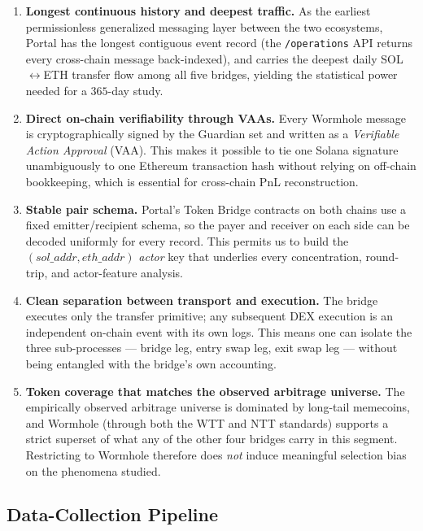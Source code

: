 \documentclass[sigconf,nonacm,10pt]{acmart}
\begin{document}
\begin{enumerate}
    \item \textbf{Longest continuous history and deepest traffic.} As the
        earliest permissionless generalized messaging layer between the two
        ecosystems, Portal has the longest contiguous event record (the
        \texttt{/operations} API returns every cross-chain message
        back-indexed), and carries the deepest daily SOL$\leftrightarrow$ETH
        transfer flow among all five bridges, yielding the statistical power
        needed for a $365$-day study.
    \item \textbf{Direct on-chain verifiability through VAAs.} Every
        Wormhole message is cryptographically signed by the Guardian set and
        written as a \emph{Verifiable Action Approval} (VAA). This makes it
        possible to tie one Solana signature unambiguously to one Ethereum
        transaction hash without relying on off-chain bookkeeping, which is
        essential for cross-chain PnL reconstruction.
    \item \textbf{Stable pair schema.} Portal's Token Bridge contracts on
        both chains use a fixed emitter/recipient schema, so the payer and
        receiver on each side can be decoded uniformly for every record. This
        permits us to build the $(sol\_addr, eth\_addr)$ \emph{actor} key
        that underlies every concentration, round-trip, and actor-feature
        analysis.
    \item \textbf{Clean separation between transport and execution.} The
        bridge executes only the transfer primitive; any subsequent DEX
        execution is an independent on-chain event with its own logs. This
        means one can isolate the three sub-processes --- bridge leg, entry
        swap leg, exit swap leg --- without being entangled with the
        bridge's own accounting.
    \item \textbf{Token coverage that matches the observed arbitrage
        universe.} The empirically observed arbitrage universe is dominated
        by long-tail memecoins, and Wormhole (through both the WTT and NTT
        standards) supports a strict superset of what any of the other four
        bridges carry in this segment. Restricting to Wormhole therefore
        does \emph{not} induce meaningful selection bias on the phenomena
        studied.
\end{enumerate}

\subsection{Data-Collection Pipeline}
\label{sec:ch4-pipeline}
\end{document}
